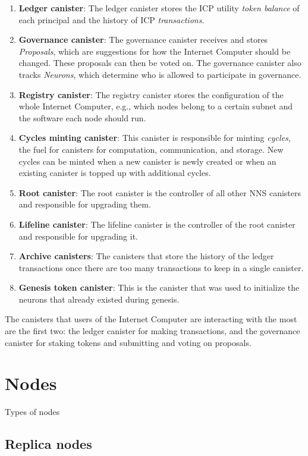 \begin{enumerate}
  \item \textbf{Ledger canister}: The ledger canister stores the ICP utility \textit{token balance} of each principal and the history of ICP \textit{transactions}.
  \item \textbf{Governance canister}: The governance canister receives and stores \textit{Proposals}, which are suggestions for how the Internet Computer should be changed. These proposals can then be voted on. The governance canister also tracks \textit{Neurons}, which determine who is allowed to participate in governance.
  \item \textbf{Registry canister}: The registry canister stores the configuration of the whole Internet Computer, e.g., which nodes belong to a certain subnet and the software each node should run.
  \item \textbf{Cycles minting canister}: This canister is responsible for minting \textit{cycles}, the fuel for canisters for computation, communication, and storage. New cycles can be minted when a new canister is newly created or when an existing canister is topped up with additional cycles.
  \item \textbf{Root canister}: The root canister is the controller of all other NNS canisters and responsible for upgrading them.
  \item \textbf{Lifeline canister}: The lifeline canister is the controller of the root canister and responsible for upgrading it.
  \item \textbf{Archive canisters}: The canisters that store the history of the ledger transactions once there are too many transactions to keep in a single canister.
  \item \textbf{Genesis token canister}: This is the canister that was used to initialize the neurons that already existed during genesis.
\end{enumerate}

The canisters that users of the Internet Computer are interacting with the most are the first two: the ledger canister for making transactions, and the governance canister for staking tokens and submitting and voting on proposals.

\section{Nodes}

Types of nodes

\subsection{Replica nodes}

